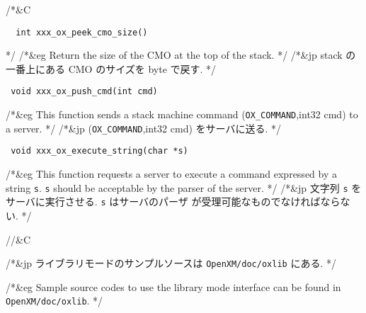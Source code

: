 /*&C

\smallskip
\begin{verbatim}
  int xxx_ox_peek_cmo_size()
\end{verbatim}
*/
/*&eg
Return the size of the CMO at the top of the stack.
*/
/*&jp
stack の一番上にある CMO のサイズを byte で戻す.
*/

\smallbreak
\begin{verbatim}
 void xxx_ox_push_cmd(int cmd)
\end{verbatim}
/*&eg
This function sends a stack machine command 
({\tt OX\_COMMAND},int32 cmd) to a server.
*/
/*&jp
({\tt OX\_COMMAND},int32 cmd) をサーバに送る. 
*/

\begin{verbatim}
 void xxx_ox_execute_string(char *s) 
\end{verbatim}
/*&eg
This function requests a server to execute a command expressed by 
a string {\tt s}.
{\tt s} should be acceptable by the parser of the server.
*/
/*&jp
文字列 {\tt s} をサーバに実行させる. {\tt s} はサーバのパーザ
が受理可能なものでなければならない. 
*/

//&C

/*&jp
ライブラリモードのサンプルソースは {\tt OpenXM/doc/oxlib}
にある.
*/

/*&eg
Sample source codes to use the library mode interface can be found in
{\tt OpenXM/doc/oxlib}.
*/

